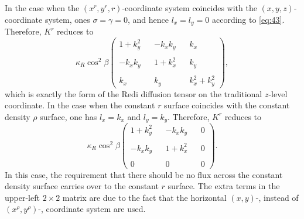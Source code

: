 \documentclass[12pt]{report}
\begin{document}
In the case when the $(x^r, y^r, r)$-coordinate system coincides with
the $(x,y,z)$-coordinate system, ones $\sigma=\gamma=0$, and hence
$l_x = l_y=0$ according to \eqref{eq:43}. Therefore, $K^r$ reduces to
\begin{equation*}
\kappa_R \cos^2\beta\left(
    \begin{matrix}
      1 + k_y^2 & { }  &  -k_xk_y & { } & {k_x }\\
          { }   &     { }   & { } & { } & { }\\
      -k_xk_y & { } & 1 + k_x^2 & { } & {k_y }\\
         { } & { } & { } & { } & { } \\
         {k_x} & { } & {k_y } & { } & k_x^2 + k_y^2
    \end{matrix}\right),
\end{equation*}
which is exactly the form of the Redi diffusion tensor on the
traditional $z$-level coordinate. In the case when the constant $r$
surface coincides with the constant density $\rho$ surface, one has
$l_x = k_x$ and $l_y=k_y$. Therefore, $K^r$ reduces to 
\begin{equation*}
\kappa_R \cos^2\beta\left(
    \begin{matrix}
      1 + k_y^2 & { }  &  -k_xk_y & { } & { 0 }\\
          { }   &     { }   & { } & { } & { }\\
      -k_xk_y & { } & 1 + k_x^2 & { } & {0 }\\
         { } & { } & { } & { } & { } \\
         {0} & { } & {0 } & { } & 0
    \end{matrix}\right).
\end{equation*}
In this case, the requirement that there should be no flux across the
constant density surface carries over to the constant $r$ surface. The
extra terms in the upper-left $2\times 2$ matrix are due to the fact
that the horizontal $(x,y)$-, instead of $(x^\rho, y^\rho)$-,
coordinate system are used. \\
\end{document}
